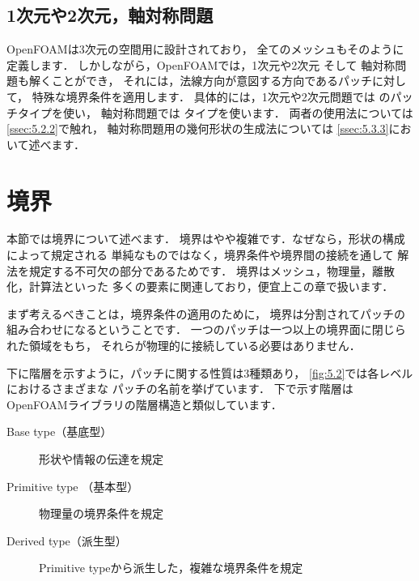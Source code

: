 \subsection{1次元や2次元，軸対称問題}
\label{ssec:5.1.4}
%
%
%
%
%
%
%
%
OpenFOAMは3次元の空間用に設計されており，
全てのメッシュもそのように定義します．
しかしながら，OpenFOAMでは，1次元や2次元
そして%
%
%
軸対称問題も解くことができ，
それには，法線方向が意図する方向であるパッチに対して，
特殊な境界条件を適用します．
具体的には，1次元や2次元問題では
%
%
のパッチタイプを使い，
軸対称問題では
%
%
タイプを使います．
両者の使用法については\autoref{ssec:5.2.2}で触れ，
軸対称問題用の幾何形状の生成法については
\autoref{ssec:5.3.3}において述べます．



\section{境界}
\label{sec:5.2}
%
本節では境界について述べます．
境界はやや複雑です．なぜなら，形状の構成によって規定される
単純なものではなく，境界条件や境界間の接続を通して
解法を規定する不可欠の部分であるためです．
境界はメッシュ，物理量，離散化，計算法といった
多くの要素に関連しており，便宜上この章で扱います．

まず考えるべきことは，境界条件の適用のために，
境界は分割されてパッチの組み合わせになるということです．
一つのパッチは一つ以上の境界面に閉じられた領域をもち，
それらが物理的に接続している必要はありません．

下に階層を示すように，パッチに関する性質は3種類あり，
\autoref{fig:5.2}では各レベルにおけるさまざまな
パッチの名前を挙げています．
下で示す階層はOpenFOAMライブラリの階層構造と類似しています．
\begin{description}
 \item[Base type（基底型）]
            形状や情報の伝達を規定
 \item[Primitive type （基本型）]
            物理量の境界条件を規定
 \item[Derived type（派生型）]
            Primitive typeから派生した，複雑な境界条件を規定
\end{description}


